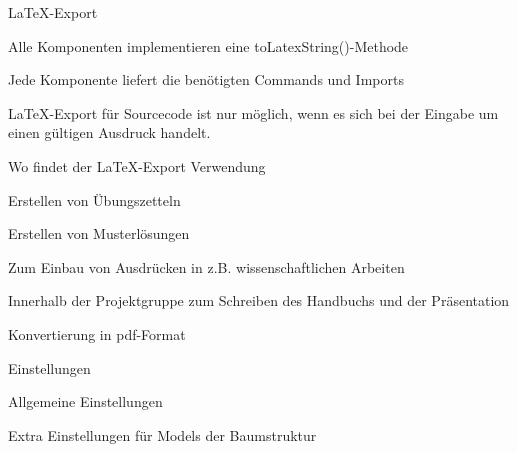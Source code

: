 {
  \begin{itemgroup}{\LaTeX-Export}
    \item Alle Komponenten implementieren eine toLatexString()-Methode
    \item Jede Komponente liefert die benötigten Commands und Imports
    \item \LaTeX-Export für Sourcecode ist nur möglich, wenn es sich bei
      der Eingabe um einen gültigen Ausdruck handelt.

  \end{itemgroup}
}

{
  \begin{itemgroup}{Wo findet der \LaTeX-Export Verwendung}
    \item Erstellen von Übungszetteln
    \item Erstellen von Musterlösungen
    \item Zum Einbau von Ausdrücken in z.B. wissenschaftlichen Arbeiten
    \item Innerhalb der Projektgruppe zum Schreiben des Handbuchs und der Präsentation
    \item Konvertierung in pdf-Format
  \end{itemgroup}
}

{
  \begin{itemgroup}{Einstellungen}
    \item Allgemeine Einstellungen
    \item Extra Einstellungen für Models der Baumstruktur

  \end{itemgroup}
}